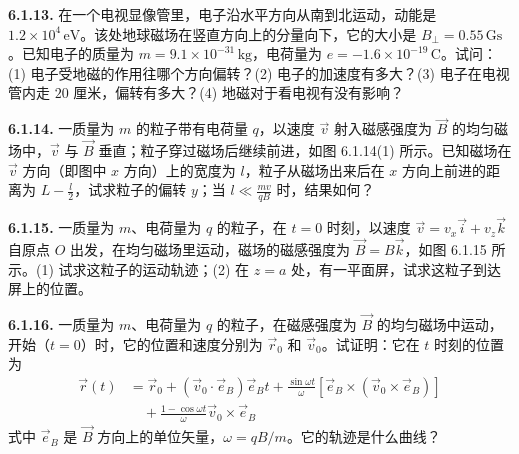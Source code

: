 \vfill
\newpage

\textbf{6.1.13.} 在一个电视显像管里，电子沿水平方向从南到北运动，动能是 $1.2 \times 10^{4}\,\mathrm{eV}$。该处地球磁场在竖直方向上的分量向下，它的大小是 $B_{\perp} = 0.55\,\mathrm{Gs}$。已知电子的质量为 $m = 9.1 \times 10^{-31}\,\mathrm{kg}$，电荷量为 $e = -1.6 \times 10^{-19}\,\mathrm{C}$。试问：(1) 电子受地磁的作用往哪个方向偏转？(2) 电子的加速度有多大？(3) 电子在电视管内走 $20$ 厘米，偏转有多大？(4) 地磁对于看电视有没有影响？

\vfill
\newpage

\textbf{6.1.14.} 一质量为 $m$ 的粒子带有电荷量 $q$，以速度 $\vec{v}$ 射入磁感强度为 $\vec{B}$ 的均匀磁场中，$\vec{v}$ 与 $\vec{B}$ 垂直；粒子穿过磁场后继续前进，如图 6.1.14(1) 所示。已知磁场在 $\vec{v}$ 方向（即图中 $x$ 方向）上的宽度为 $l$，粒子从磁场出来后在 $x$ 方向上前进的距离为 $\displaystyle L - \frac{l}{2}$，试求粒子的偏转 $y$；当 $\displaystyle l \ll \frac{mv}{qB}$ 时，结果如何？

\begin{center}
\end{center}

\vfill
\newpage

\textbf{6.1.15.} 一质量为 $m$、电荷量为 $q$ 的粒子，在 $t = 0$ 时刻，以速度 $\vec{v} = v_{x}\vec{i} + v_{z}\vec{k}$ 自原点 $O$ 出发，在均匀磁场里运动，磁场的磁感强度为 $\vec{B} = B\vec{k}$，如图 6.1.15 所示。(1) 试求这粒子的运动轨迹；(2) 在 $z = a$ 处，有一平面屏，试求这粒子到达屏上的位置。

\begin{center}
\end{center}

\vfill
\newpage

\textbf{6.1.16.} 一质量为 $m$、电荷量为 $q$ 的粒子，在磁感强度为 $\vec{B}$ 的均匀磁场中运动，开始（$t = 0$）时，它的位置和速度分别为 $\vec{r}_{0}$ 和 $\vec{v}_{0}$。试证明：它在 $t$ 时刻的位置为
\[
\begin{aligned}
\vec{r}(t) &= \vec{r}_{0} + (\vec{v}_{0} \cdot \vec{e}_{B}) \vec{e}_{B} t + \frac{\sin \omega t}{\omega} \left[ \vec{e}_{B} \times (\vec{v}_{0} \times \vec{e}_{B}) \right] \\
&\quad + \frac{1 - \cos \omega t}{\omega} \vec{v}_{0} \times \vec{e}_{B}
\end{aligned}
\]
式中 $\vec{e}_{B}$ 是 $\vec{B}$ 方向上的单位矢量，$\omega = qB/m$。它的轨迹是什么曲线？


